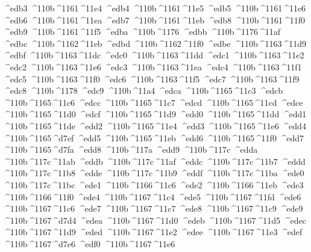 \checkit ^^^^edb3 ^^^^110b^^^^1161^^^^11e4
\checkit ^^^^edb4 ^^^^110b^^^^1161^^^^11e5
\checkit ^^^^edb5 ^^^^110b^^^^1161^^^^11e6
\checkit ^^^^edb6 ^^^^110b^^^^1161^^^^11ea
\checkit ^^^^edb7 ^^^^110b^^^^1161^^^^11eb
\checkit ^^^^edb8 ^^^^110b^^^^1161^^^^11f0
\checkit ^^^^edb9 ^^^^110b^^^^1161^^^^11f5
\checkit ^^^^edba ^^^^110b^^^^1176
\checkit ^^^^edbb ^^^^110b^^^^1176^^^^11af
\checkit ^^^^edbc ^^^^110b^^^^1162^^^^11eb
\checkit ^^^^edbd ^^^^110b^^^^1162^^^^11f0
\checkit ^^^^edbe ^^^^110b^^^^1163^^^^11d9
\checkit ^^^^edbf ^^^^110b^^^^1163^^^^11dc
\checkit ^^^^edc0 ^^^^110b^^^^1163^^^^11dd
\checkit ^^^^edc1 ^^^^110b^^^^1163^^^^11e2
\checkit ^^^^edc2 ^^^^110b^^^^1163^^^^11e6
\checkit ^^^^edc3 ^^^^110b^^^^1163^^^^11ea
\checkit ^^^^edc4 ^^^^110b^^^^1163^^^^11f1
\checkit ^^^^edc5 ^^^^110b^^^^1163^^^^11f0
\checkit ^^^^edc6 ^^^^110b^^^^1163^^^^11f5
\checkit ^^^^edc7 ^^^^110b^^^^1163^^^^11f9
\checkit ^^^^edc8 ^^^^110b^^^^1178
\checkit ^^^^edc9 ^^^^110b^^^^11a4
\checkit ^^^^edca ^^^^110b^^^^1165^^^^11c3
\checkit ^^^^edcb ^^^^110b^^^^1165^^^^11c6
\checkit ^^^^edcc ^^^^110b^^^^1165^^^^11c7
\checkit ^^^^edcd ^^^^110b^^^^1165^^^^11cd
\checkit ^^^^edce ^^^^110b^^^^1165^^^^11d0
\checkit ^^^^edcf ^^^^110b^^^^1165^^^^11d9
\checkit ^^^^edd0 ^^^^110b^^^^1165^^^^11dd
\checkit ^^^^edd1 ^^^^110b^^^^1165^^^^11de
\checkit ^^^^edd2 ^^^^110b^^^^1165^^^^11e4
\checkit ^^^^edd3 ^^^^110b^^^^1165^^^^11e6
\checkit ^^^^edd4 ^^^^110b^^^^1165^^^^d7ef
\checkit ^^^^edd5 ^^^^110b^^^^1165^^^^11eb
\checkit ^^^^edd6 ^^^^110b^^^^1165^^^^11f0
\checkit ^^^^edd7 ^^^^110b^^^^1165^^^^d7fa
\checkit ^^^^edd8 ^^^^110b^^^^117a
\checkit ^^^^edd9 ^^^^110b^^^^117c
\checkit ^^^^edda ^^^^110b^^^^117c^^^^11ab
\checkit ^^^^eddb ^^^^110b^^^^117c^^^^11af
\checkit ^^^^eddc ^^^^110b^^^^117c^^^^11b7
\checkit ^^^^eddd ^^^^110b^^^^117c^^^^11b8
\checkit ^^^^edde ^^^^110b^^^^117c^^^^11b9
\checkit ^^^^eddf ^^^^110b^^^^117c^^^^11ba
\checkit ^^^^ede0 ^^^^110b^^^^117c^^^^11bc
\checkit ^^^^ede1 ^^^^110b^^^^1166^^^^11c6
\checkit ^^^^ede2 ^^^^110b^^^^1166^^^^11eb
\checkit ^^^^ede3 ^^^^110b^^^^1166^^^^11f0
\checkit ^^^^ede4 ^^^^110b^^^^1167^^^^11c4
\checkit ^^^^ede5 ^^^^110b^^^^1167^^^^11fd
\checkit ^^^^ede6 ^^^^110b^^^^1167^^^^11c6
\checkit ^^^^ede7 ^^^^110b^^^^1167^^^^11c7
\checkit ^^^^ede8 ^^^^110b^^^^1167^^^^11c9
\checkit ^^^^ede9 ^^^^110b^^^^1167^^^^d7d4
\checkit ^^^^edea ^^^^110b^^^^1167^^^^11d0
\checkit ^^^^edeb ^^^^110b^^^^1167^^^^11d5
\checkit ^^^^edec ^^^^110b^^^^1167^^^^11d9
\checkit ^^^^eded ^^^^110b^^^^1167^^^^11e2
\checkit ^^^^edee ^^^^110b^^^^1167^^^^11e3
\checkit ^^^^edef ^^^^110b^^^^1167^^^^d7e6
\checkit ^^^^edf0 ^^^^110b^^^^1167^^^^11e6
